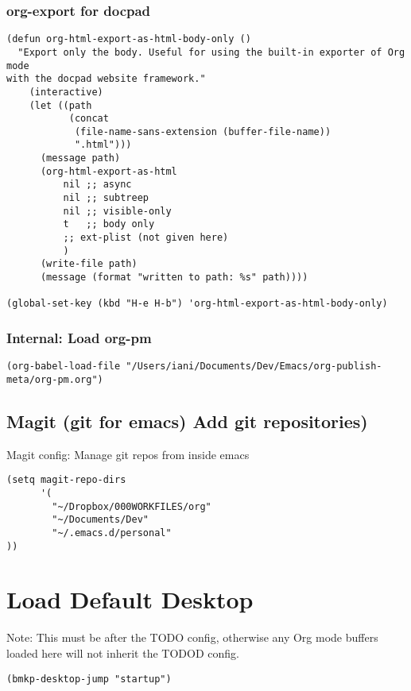 \documentclass{article}
\begin{document}
\subsubsection{org-export for docpad}
\label{sec-2-5-20}
\begin{verbatim}
(defun org-html-export-as-html-body-only ()
  "Export only the body. Useful for using the built-in exporter of Org mode
with the docpad website framework."
    (interactive)
    (let ((path
           (concat
            (file-name-sans-extension (buffer-file-name))
            ".html")))
      (message path)
      (org-html-export-as-html
          nil ;; async
          nil ;; subtreep
          nil ;; visible-only
          t   ;; body only
          ;; ext-plist (not given here)
          )
      (write-file path)
      (message (format "written to path: %s" path))))

(global-set-key (kbd "H-e H-b") 'org-html-export-as-html-body-only)
\end{verbatim}
\subsubsection{Internal: Load org-pm}
\label{sec-2-5-21}

\begin{verbatim}
(org-babel-load-file "/Users/iani/Documents/Dev/Emacs/org-publish-meta/org-pm.org")
\end{verbatim}

\subsection{Magit (git for emacs) Add git repositories)}
\label{sec-2-6}

Magit config: Manage git repos from inside emacs

\begin{verbatim}
(setq magit-repo-dirs
      '(
        "~/Dropbox/000WORKFILES/org"
        "~/Documents/Dev"
        "~/.emacs.d/personal"
))
\end{verbatim}


\section{Load Default Desktop}
\label{sec-3}

Note: This must be after the TODO config, otherwise any Org mode buffers loaded here will not inherit the TODOD config.

\begin{verbatim}
(bmkp-desktop-jump "startup")
\end{verbatim}
\end{document}
